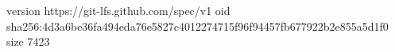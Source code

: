 version https://git-lfs.github.com/spec/v1
oid sha256:4d3a6be36fa494eda76e5827c4012274715f96f94457fb677922b2e855a5d1f0
size 7423
